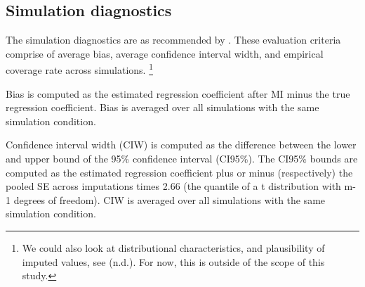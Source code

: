 \documentclass[article]{jss}
\begin{document}
\subsection{Simulation diagnostics}
The simulation diagnostics are as recommended by \citep[\S~2.5.2]{buur18}. These evaluation criteria comprise of average bias, average confidence interval width, and empirical coverage rate across simulations.%
\footnote{We could also look at distributional characteristics, and plausibility of imputed values, see \cite{vinknd} (n.d.). For now, this is outside of the scope of this study.} %



Bias is computed as the estimated regression coefficient after MI minus the true regression coefficient. Bias is averaged over all simulations with the same simulation condition.

Confidence interval width (CIW) is computed as the difference between the lower and upper bound of the 95\% confidence interval (CI95\%). The CI95\% bounds are computed as the estimated regression coefficient plus or minus (respectively) the pooled SE across imputations times 2.66 (the quantile of a t distribution with m-1 degrees of freedom). CIW is averaged over all simulations with the same simulation condition.
\end{document}
